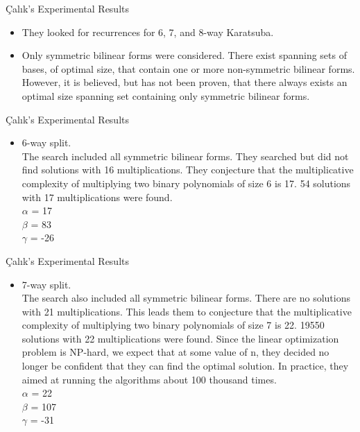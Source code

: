 \documentclass[12pt]{beamer}
\begin{document}
\begin{frame}{Çalık's Experimental Results}
\begin{itemize}

\item They looked for recurrences for 6, 7, and 8-way Karatsuba.
\item Only symmetric bilinear forms were considered. There exist spanning sets of bases, of optimal size, that contain one or more non-symmetric bilinear forms. However, it is believed,
but has not been proven, that there always exists an optimal size spanning set containing only symmetric bilinear forms.
\end{itemize}
\vskip 1cm


\end{frame}


\begin{frame}{Çalık's Experimental Results}

\begin{itemize}
 \item 6-way split.\\
The search included all symmetric bilinear forms. They searched but did not find solutions with 16 multiplications. They conjecture that the multiplicative complexity of multiplying two binary polynomials of size 6 is 17. 54 solutions with 17 multiplications were found. \\

$\alpha$ = 17\\
$\beta$ = 83\\
$\gamma$ = -26\\
\end{itemize}

\end{frame}

\begin{frame}{Çalık's Experimental Results}

\begin{itemize}

  \item 7-way split.\\
  The search also included all symmetric bilinear forms. There are no solutions with 21 multiplications. This leads them to conjecture that the multiplicative complexity of multiplying two binary polynomials of size 7 is 22. 19550 solutions with 22 multiplications were found. Since the linear optimization problem is NP-hard, we expect that at some value of n, they decided no longer be confident that they can find the optimal solution. In practice, they aimed at running the algorithms about 100 thousand times.\\
$\alpha$ = 22\\
$\beta$ = 107\\
$\gamma$ = -31
  
\end{itemize}

\end{frame}
\end{document}
